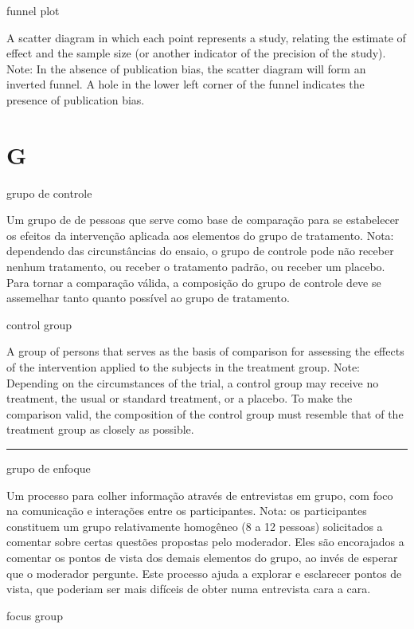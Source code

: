 \documentclass[
]{book}
\begin{document}
funnel plot

A scatter diagram in which each point represents a study, relating the estimate of effect and the sample size (or another indicator of the precision of the study). Note: In the absence of publication bias, the scatter diagram will form an inverted funnel. A hole in the lower left corner of the funnel indicates the presence of publication bias.

\hypertarget{g}{%
\chapter*{G}\label{g}}

grupo de controle

Um grupo de de pessoas que serve como base de comparação para se estabelecer os efeitos da intervenção aplicada aos elementos do grupo de tratamento. Nota: dependendo das circunstâncias do ensaio, o grupo de controle pode não receber nenhum tratamento, ou receber o tratamento padrão, ou receber um placebo. Para tornar a comparação válida, a composição do grupo de controle deve se assemelhar tanto quanto possível ao grupo de tratamento.

control group

A group of persons that serves as the basis of comparison for assessing the effects of the intervention applied to the subjects in the treatment group. Note: Depending on the circumstances of the trial, a control group may receive no treatment, the usual or standard treatment, or a placebo. To make the comparison valid, the composition of the control group must resemble that of the treatment group as closely as possible.

\begin{center}\rule{0.5\linewidth}{0.5pt}\end{center}

grupo de enfoque

Um processo para colher informação através de entrevistas em grupo, com foco na comunicação e interações entre os participantes. Nota: os participantes constituem um grupo relativamente homogêneo (8 a 12 pessoas) solicitados a comentar sobre certas questões propostas pelo moderador. Eles são encorajados a comentar os pontos de vista dos demais elementos do grupo, ao invés de esperar que o moderador pergunte. Este processo ajuda a explorar e esclarecer pontos de vista, que poderiam ser mais difíceis de obter numa entrevista cara a cara.

focus group
\end{document}

